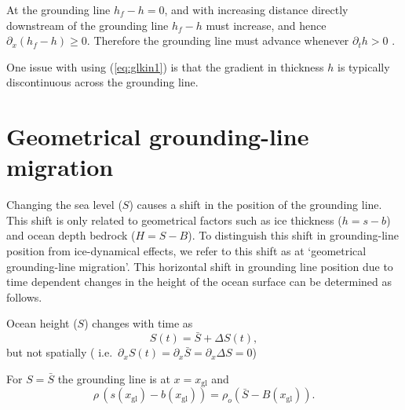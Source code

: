\documentclass[10pt,a4paper]{book}
\newcommand{\p}{\partial}
\newcommand{\xgl}{x_{\mathrm{gl}}}
\begin{document}
At the grounding line $h_f-h=0$, and with increasing distance directly
downstream of the grounding line $h_f-h$ must increase, and hence
$\p_x (h_f -h) \ge 0$.  Therefore the grounding line must advance
whenever $\p_t h > 0$ .


One issue with using (\ref{eq:glkin1}) is that the gradient in
thickness $h$ is typically discontinuous across the grounding
line.


\section{Geometrical grounding-line migration}



Changing the sea level ($S$) causes a shift in the position of the
grounding line. This shift is only related to geometrical factors such
as ice thickness ($h=s-b$) and ocean depth bedrock ($H=S-B$). To
distinguish this shift in grounding-line position from ice-dynamical
effects, we refer to this shift as at `geometrical grounding-line
migration'. This horizontal shift in grounding line position due to
time dependent changes in the height of the ocean surface can be determined as
follows.


Ocean height ($S$) changes with time as
\[
S(t)=\bar{S}+\Delta S(t) ,
\]
but not spatially ( i.e.\ $\p_x S(t) = \p_x \bar{S} = \p_x \Delta S=0$) 

For $S=\bar{S}$ the grounding line is at  $x=\xgl$ and
\begin{equation}
\rho \, \left (s(\xgl)-b(\xgl) \right )=\rho_o (\bar{S}-B(\xgl)) .
\label{eq:mean}
\end{equation}

\end{document}

